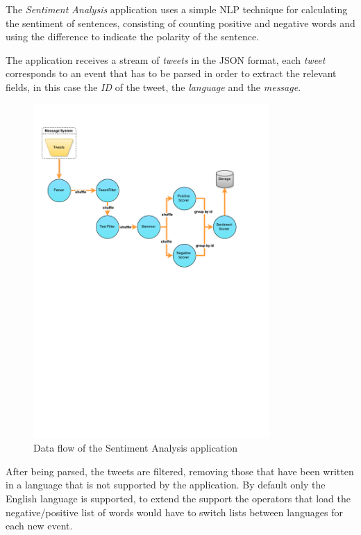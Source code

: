 \documentclass[ppgc,diss,english]{iiufrgs}
\begin{document}
The \emph{Sentiment Analysis} application uses a simple NLP technique for calculating the sentiment of sentences, consisting of counting positive and negative words and using the difference to indicate the polarity of the sentence.

The application receives a stream of \emph{tweets} in the JSON format, each \emph{tweet} corresponds to an event that has to be parsed in order to extract the relevant fields, in this case the \emph{ID} of the tweet, the \emph{language} and the \emph{message}.

\begin{figure}[!ht]
	\centering
	\includegraphics[width=0.8\textwidth]{images/apps/TwitterSentiment2.pdf}
	\caption{Data flow of the Sentiment Analysis application}
	\label{fig:app_sentiment_analysis}
\end{figure}

After being parsed, the tweets are filtered, removing those that have been written in a language that is not supported by the application. By default only the English language is supported, to extend the support the operators that load the negative/positive list of words would have to switch lists between languages for each new event.
\end{document}
